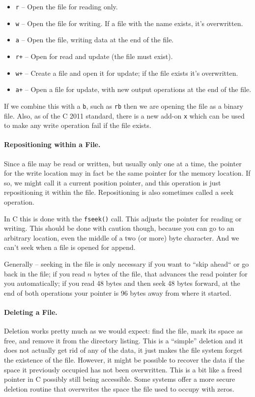 \begin{itemize}
	\item \texttt{r} -- Open the file for reading only.
	\item \texttt{w} -- Open the file for writing. If a file with the name exists, it's overwritten.
	\item \texttt{a} -- Open the file, writing data at the end of the file.
	\item \texttt{r+} -- Open for read and update (the file must exist).
	\item \texttt{w+} -- Create a file and open it for update; if the file exists it's overwritten.
	\item \texttt{a+} -- Open a file for update, with new output operations at the end of the file.
\end{itemize}

If we combine this with a \texttt{b}, such as \texttt{rb} then we are opening the file as a binary file. Also, as of the C 2011 standard, there is a new add-on \texttt{x} which can be used to make any write operation fail if the file exists.

\paragraph{Repositioning within a File.} Since a file may be read or written, but usually only one at a time, the pointer for the write location may in fact be the same pointer for the memory location. If so, we might call it a current position pointer, and this operation is just repositioning it within the file. Repositioning is also sometimes called a seek operation.

In C this is done with the \texttt{fseek()} call. This adjusts the pointer for reading or writing. This should be done with caution though, because you can go to an arbitrary location, even the middle of a two (or more) byte character. And we can't seek when a file is opened for append.

Generally -- seeking in the file is only necessary if you want to ``skip ahead`` or go back in the file; if you read $n$ bytes of the file, that advances the read pointer for you automatically; if you read 48 bytes and then seek 48 bytes forward, at the end of both operations your pointer is 96 bytes away from where it started.

\paragraph{Deleting a File.} Deletion works pretty much as we would expect: find the file, mark its space as free, and remove it from the directory listing. This is a ``simple'' deletion and it does not actually get rid of any of the data, it just makes the file system forget the existence of the file. However, it might be possible to recover the data if the space it previously occupied has not been overwritten. This is a bit like a freed pointer in C possibly still being accessible. Some systems offer a more secure deletion routine that overwrites the space the file used to occupy with zeros.

